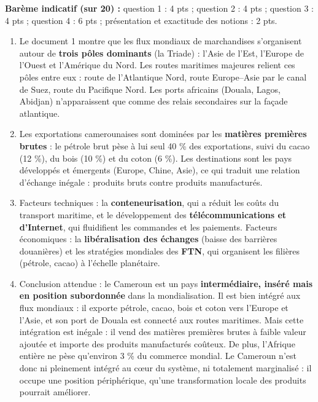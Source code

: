 \documentclass[11pt]{article}
\begin{document}
\begin{corrige}
\textbf{Barème indicatif (sur 20) :} question 1 : 4 pts ; question 2 : 4 pts ; question 3 : 4 pts ; question 4 : 6 pts ; présentation et exactitude des notions : 2 pts.
\begin{enumerate}
\item Le document 1 montre que les flux mondiaux de marchandises s'organisent autour de \textbf{trois pôles dominants} (la Triade) : l'Asie de l'Est, l'Europe de l'Ouest et l'Amérique du Nord. Les routes maritimes majeures relient ces pôles entre eux : route de l'Atlantique Nord, route Europe--Asie par le canal de Suez, route du Pacifique Nord. Les ports africains (Douala, Lagos, Abidjan) n'apparaissent que comme des relais secondaires sur la façade atlantique.
\item Les exportations camerounaises sont dominées par les \textbf{matières premières brutes} : le pétrole brut pèse à lui seul 40 \% des exportations, suivi du cacao (12 \%), du bois (10 \%) et du coton (6 \%). Les destinations sont les pays développés et émergents (Europe, Chine, Asie), ce qui traduit une relation d'échange inégale : produits bruts contre produits manufacturés.
\item Facteurs techniques : la \textbf{conteneurisation}, qui a réduit les coûts du transport maritime, et le développement des \textbf{télécommunications et d'Internet}, qui fluidifient les commandes et les paiements. Facteurs économiques : la \textbf{libéralisation des échanges} (baisse des barrières douanières) et les stratégies mondiales des \textbf{FTN}, qui organisent les filières (pétrole, cacao) à l'échelle planétaire.
\item Conclusion attendue : le Cameroun est un pays \textbf{intermédiaire, inséré mais en position subordonnée} dans la mondialisation. Il est bien intégré aux flux mondiaux : il exporte pétrole, cacao, bois et coton vers l'Europe et l'Asie, et son port de Douala est connecté aux routes maritimes. Mais cette intégration est inégale : il vend des matières premières brutes à faible valeur ajoutée et importe des produits manufacturés coûteux. De plus, l'Afrique entière ne pèse qu'environ 3 \% du commerce mondial. Le Cameroun n'est donc ni pleinement intégré au cœur du système, ni totalement marginalisé : il occupe une position périphérique, qu'une transformation locale des produits pourrait améliorer.
\end{enumerate}
\end{corrige}
\end{document}
